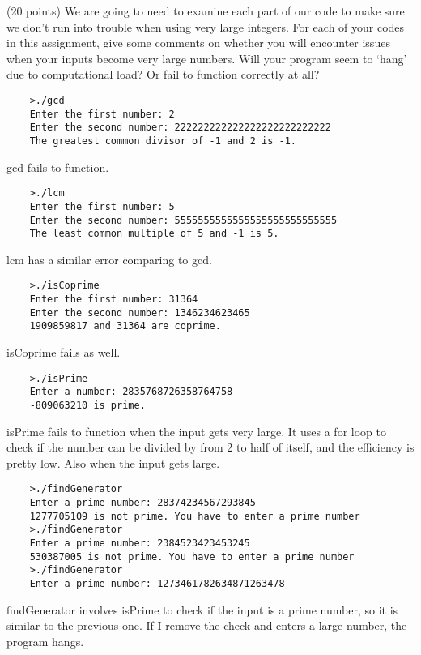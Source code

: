 \documentclass{article}
\newcommand{\myhrule}{ \begin{center}\rule{.9\linewidth}{.25mm}\end{center} }
\begin{document}
\vspace*{1em}
(20 points) We are going to need to examine each part of our code to make sure we don't run into trouble when using very large integers. For each of your codes in this assignment, give some comments on whether you will encounter issues when your inputs become very large numbers. Will your program seem to `hang' due to computational load? Or fail to function correctly at all?
\begin{verbatim}
    >./gcd
    Enter the first number: 2
    Enter the second number: 222222222222222222222222222
    The greatest common divisor of -1 and 2 is -1.
\end{verbatim}
gcd fails to function.
\begin{verbatim}
    >./lcm
    Enter the first number: 5
    Enter the second number: 5555555555555555555555555555
    The least common multiple of 5 and -1 is 5.
\end{verbatim}
lcm has a similar error comparing to gcd.
\begin{verbatim}
    >./isCoprime
    Enter the first number: 31364
    Enter the second number: 1346234623465
    1909859817 and 31364 are coprime.
\end{verbatim}
isCoprime fails as well.
\begin{verbatim}
    >./isPrime
    Enter a number: 2835768726358764758
    -809063210 is prime.
\end{verbatim}
isPrime fails to function when the input gets very large. It uses a for loop to check if the number can be divided by from 2 to half of itself, and the efficiency is pretty low. Also when the input gets large.
\begin{verbatim}
    >./findGenerator
    Enter a prime number: 28374234567293845
    1277705109 is not prime. You have to enter a prime number
    >./findGenerator
    Enter a prime number: 2384523423453245
    530387005 is not prime. You have to enter a prime number
    >./findGenerator
    Enter a prime number: 1273461782634871263478
\end{verbatim}
findGenerator involves isPrime to check if the input is a prime number, so it is similar to the previous one. If I remove the check and enters a large number, the program hangs.

 
\end{document}
